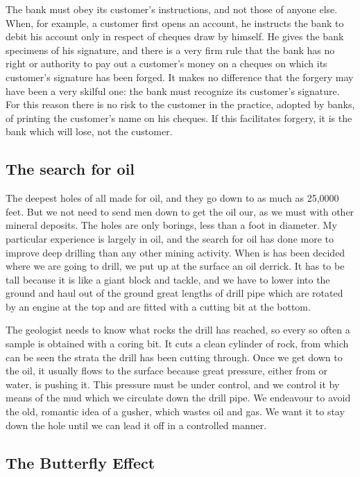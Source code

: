 \documentclass[11pt]{article}
\begin{document}
The bank must obey its customer's instructions, and not those of anyone else. When, for example, a customer first opens an account, he instructs the bank to debit his account only in respect of cheques draw by himself. He gives the bank specimens of his signature, and there is a very firm rule that the bank has no right or authority to pay out a customer's money on a cheques on which its customer's signature has been forged. It makes no difference that the forgery may have been a very skilful one: the bank must recognize its customer's signature. For this reason there is no risk to the customer in the practice, adopted by banks, of printing the customer's name on his cheques. If this facilitates forgery, it is the bank which will lose, not the customer.
\subsection{The search for oil}
\label{sec-2-13}

The deepest holes of all made for oil, and they go down to as much as 25,0000 feet. But we not need to send men down to get the oil our, as we must with other mineral deposits. The holes are only borings, less than a foot in diameter. My particular experience is largely in oil, and the search for oil has done more to improve deep drilling than any other mining activity. When is has been decided where we are going to drill, we put up at the surface an oil derrick. It has to be tall because it is like a giant block and tackle, and we have to lower into the ground and haul out of the ground great lengths of drill pipe which are rotated by an engine at the top and are fitted with a cutting bit at the bottom.

The geologist needs to know what rocks the drill has reached, so every so often a sample is obtained with a coring bit. It cuts a clean cylinder of rock, from which can be seen the strata the drill has been cutting through. Once we get down to the oil, it usually flows to the surface because great pressure, either from or water, is pushing it. This pressure must be under control, and we control it by means of the mud which we circulate down the drill pipe. We endeavour to avoid the old, romantic idea of a gusher, which wastes oil and gas. We want it to stay down the hole until we can lead it off in a controlled manner.
\subsection{The Butterfly Effect}
\label{sec-2-14}
\end{document}
